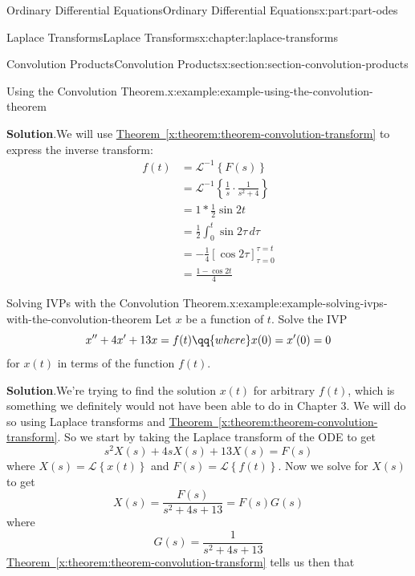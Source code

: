 \documentclass[oneside,10pt,]{book}
\newcommand{\blocktitlefont}{\relax}
\newcommand{\xreffont}{\relax}
\numberwithin{equation}{part}
\newcommand{\Int}[2]{\int_{#1}^{#2}}
\newcommand{\Laplace}[1]{\mathcal{L}\left\{#1\right\}}
\newcommand{\iLaplace}[1]{\mathcal{L}^{-1}\left\{#1\right\}}
\newcommand{\amp}{&}
\begin{document}
\begin{partptx}{Ordinary Differential Equations}{}{Ordinary Differential Equations}{}{}{x:part:part-odes}
\begin{chapterptx}{Laplace Transforms}{}{Laplace Transforms}{}{}{x:chapter:laplace-transforms}
\begin{sectionptx}{Convolution Products}{}{Convolution Products}{}{}{x:section:section-convolution-products}
\begin{example}{Using the Convolution Theorem.}{x:example:example-using-the-convolution-theorem}
\par\smallskip%
\noindent\textbf{\blocktitlefont Solution}.\hypertarget{g:solution:idp105548781584288}{}\quad{}We will use \hyperref[x:theorem:theorem-convolution-transform]{Theorem~{\xreffont\ref{x:theorem:theorem-convolution-transform}}} to express the inverse transform:%
\begin{align*}
f(t) \amp= \iLaplace{F(s)}\\
\amp= \iLaplace{\frac{1}{s}\cdot\frac{1}{s^{2}+4}}\\
\amp= 1\ast \frac{1}{2}\sin2t\\
\amp= \frac{1}{2}\Int{0}{t}\sin2\tau\,d\tau\\
\amp= -\frac{1}{4}\left[\cos2\tau\right]_{\tau=0}^{\tau=t}\\
\amp= \frac{1-\cos2t}{4}
\end{align*}
%
\end{example}
\begin{example}{Solving IVPs with the Convolution Theorem.}{x:example:example-solving-ivps-with-the-convolution-theorem}%
Let \(x\) be a function of \(t\). Solve the IVP%
\begin{equation*}
x''+4x'+13x = f(t)\qq{where}x(0) = x'(0) = 0
\end{equation*}
for \(x(t)\) in terms of the function \(f(t)\).%
\par\smallskip%
\noindent\textbf{\blocktitlefont Solution}.\hypertarget{g:solution:idp105548781589792}{}\quad{}We're trying to find the solution \(x(t)\) for arbitrary \(f(t)\), which is something we definitely would not have been able to do in Chapter 3. We will do so using Laplace transforms and \hyperref[x:theorem:theorem-convolution-transform]{Theorem~{\xreffont\ref{x:theorem:theorem-convolution-transform}}}. So we start by taking the Laplace transform of the ODE to get%
\begin{equation*}
s^{2}X(s) +4sX(s) + 13X(s) = F(s)
\end{equation*}
where \(X(s) = \Laplace{x(t)}\) and \(F(s) = \Laplace{f(t)}\). Now we solve for \(X(s)\) to get%
\begin{equation*}
X(s) = \frac{F(s)}{s^{2}+4s+13} = F(s)G(s)
\end{equation*}
where%
\begin{equation*}
G(s) = \frac{1}{s^{2}+4s+13}
\end{equation*}
\hyperref[x:theorem:theorem-convolution-transform]{Theorem~{\xreffont\ref{x:theorem:theorem-convolution-transform}}} tells us then that%
\begin{equation*}

\end{equation*}
\end{example}
\end{sectionptx}
\end{chapterptx}
\end{partptx}
\end{document}
